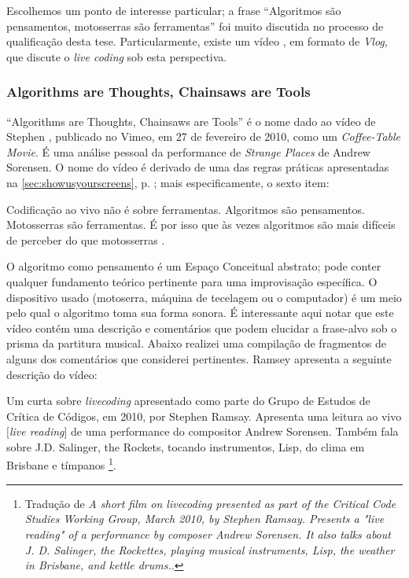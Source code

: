 Escolhemos um ponto de interesse particular; a frase ``Algoritmos são pensamentos, motosserras são ferramentas'' foi muito discutida no processo de qualificação desta tese. Particularmente, existe um vídeo , em formato de \emph{Vlog}, que discute o \emph{live coding} sob esta perspectiva.
 
\subsubsection{Algorithms are Thoughts, Chainsaws are Tools}

``Algorithms are Thoughts, Chainsaws are Tools'' é o nome dado ao vídeo de Stephen , publicado no Vimeo, em  27 de fevereiro de 2010, como um \emph{Coffee-Table Movie}. É uma análise pessoal da performance de \emph{Strange Places} de Andrew Sorensen. O nome do vídeo é derivado de uma das regras práticas apresentadas na \autoref{sec:showusyourscreens}, p. \pageref{sec:showusyourscreens}; mais especificamente, o sexto item:

\begin{citacao}
Codificação ao vivo não é sobre ferramentas. Algoritmos são pensamentos. Motosserras são ferramentas. É por isso que às vezes algoritmos são mais difíceis de perceber do que motosserras \cite[p.~22; item 6]{griffiths_fluxus:_2008}.
\end{citacao}

O algoritmo como pensamento é um Espaço Conceitual abstrato; pode conter qualquer fundamento teórico pertinente para uma improvisação específica. O dispositivo usado (motoserra, máquina de tecelagem ou o computador) é um meio pelo qual o algoritmo toma sua forma sonora. É interessante aqui notar que este vídeo contém uma descrição e comentários que podem elucidar a frase-alvo sob o prisma da partitura musical. Abaixo realizei uma compilação de fragmentos de alguns dos comentários que considerei pertinentes. Ramsey apresenta a seguinte descrição do vídeo:

\begin{citacao}
Um curta sobre \emph{livecoding} apresentado como parte do Grupo de Estudos de Crítica de Códigos, em 2010, por Stephen Ramsay. Apresenta uma leitura ao vivo $[$\emph{live reading}$]$ de uma performance do compositor Andrew Sorensen. Também fala sobre J.D. Salinger, the Rockets, tocando instrumentos, Lisp, do clima em Brisbane e tímpanos \footnote{ Tradução de \emph{A short film on livecoding presented as part of the Critical Code Studies Working Group, March 2010, by Stephen Ramsay. Presents a "live reading" of a performance by composer Andrew Sorensen. It also talks about J. D. Salinger, the Rockettes, playing musical instruments, Lisp, the weather in Brisbane, and kettle drums.}.}.
\end{citacao}

